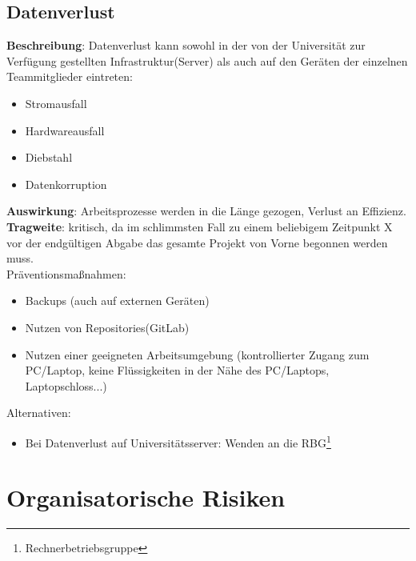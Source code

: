 \documentclass[a4paper, 12pt, titlepage]{scrartcl}
\begin{document}
	\subsection{Datenverlust}
		\textbf{Beschreibung}: Datenverlust kann sowohl in der von der Universit\"at zur Verf\"ugung gestellten Infrastruktur(Server) als auch auf den Ger\"aten der einzelnen Teammitglieder eintreten:
			\begin{itemize}
				\item Stromausfall
				\item Hardwareausfall
				\item Diebstahl
				\item Datenkorruption
			\end{itemize}
		\textbf{Auswirkung}: Arbeitsprozesse werden in die L\"ange gezogen, Verlust an Effizienz.\\
		\textbf{Tragweite}: kritisch, da im schlimmsten Fall zu einem beliebigem Zeitpunkt X vor der endg\"ultigen Abgabe das gesamte Projekt von Vorne begonnen werden muss.\\
		Pr\"aventionsma\ss nahmen:
			\begin{itemize}
				\item Backups (auch auf externen Ger\"aten)
				\item Nutzen von Repositories(GitLab)
				\item Nutzen einer geeigneten Arbeitsumgebung (kontrollierter Zugang zum PC/Laptop, keine Fl\"ussigkeiten in der N\"ahe des PC/Laptops, Laptopschloss...)
			\end{itemize}
		Alternativen: 
			\begin{itemize}
				\item Bei Datenverlust auf Universit\"atsserver: Wenden an die RBG\footnote{Rechnerbetriebsgruppe}
			\end{itemize}

\newpage
\section{Organisatorische Risiken}
\end{document}
